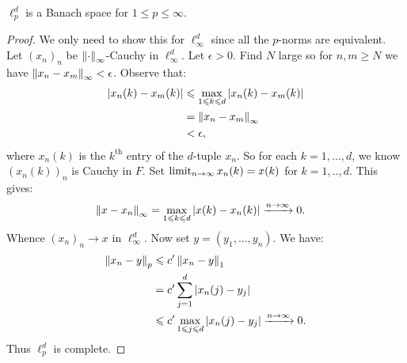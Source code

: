     \begin{proposition} 
        $\ell_p^d$ is a Banach space for $1 \leq p \leq \infty$.
    \end{proposition}
        \begin{proof}
            We only need to show this for $\ell_\infty^d$ since all the $p$-norms are equivalent. Let $(x_n)_n$ be $\left\lVert \cdot \right\rVert_\infty$-Cauchy in $\ell_\infty^d$. Let $\epsilon > 0$. Find $N$ large so for $n,m \geq N$ we have $\left\lVert x_n - x_m \right\rVert_\infty < \epsilon$. Observe that:
                \begin{equation*}
                \begin{split}
                    |x_n(k) - x_m(k)|
                    & \leqslant \max_{1 \leqslant k \leqslant d}|x_n(k) - x_m(k)| \\
                    & = \left\lVert x_n - x_m \right\rVert_\infty \\
                    & < \epsilon,
                \end{split}
                \end{equation*}
            where $x_n(k)$ is the $k^\text{th}$ entry of the $d$-tuple $x_n$. So for each $k = 1,...,d$, we know $(x_n(k))_{n}$ is Cauchy in $F$. Set $\operatorname*{limit}_{n \rightarrow \infty}x_n(k) = x(k)$ for $k=1,..,d$. This gives:
                \begin{equation*}
                \begin{split}
                    \left\lVert x - x_n \right\rVert_\infty 
                    & = \max_{1 \leqslant k \leqslant d}|x(k) - x_n(k)| \xrightarrow{n \rightarrow \infty} 0.
                \end{split}
                \end{equation*}
            Whence $(x_n)_n \rightarrow x$ in $\ell_\infty^d$. Now set $y = (y_1,...,y_n)$. We have:
                \begin{equation*}
                \begin{split}
                    \left\lVert x_n - y \right\rVert_p 
                    & \leqslant c' \left\lVert x_n - y \right\rVert_1 \\
                    & = c' \sum_{j = 1}^d |x_n(j) - y_j | \\
                    & \leqslant c' \max_{1 \leqslant j \leqslant d}\left| x_n(j) - y_j \right| \xrightarrow{n\rightarrow \infty} 0.
                \end{split}
                \end{equation*}
            Thus $\ell_p^d$ is complete.
        \end{proof}

